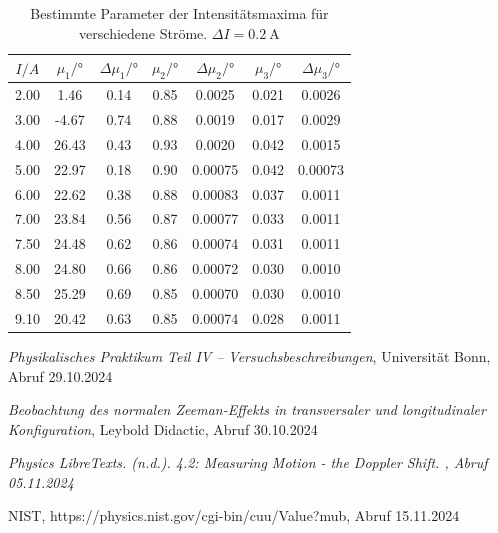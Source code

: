 \documentclass{article}
\begin{document}
\begin{table}[h]
  \centering
  \begin{tabular}{|ccccccc|}
    \toprule
    {$I/\si{A}$} & {$\mu_1/\si{\degree}$} & {$\Delta \mu_1/\si{\degree}$} & {$\mu_2/\si{\degree}$} & {$\Delta \mu_2/\si{\degree}$} & {$\mu_3/\si{\degree}$} & {$\Delta \mu_3/\si{\degree}$} \\
    \midrule
      2.00 & 1.46 & 0.14 & 0.85 & 0.0025 & 0.021 & 0.0026 \\
      3.00 & -4.67 & 0.74 & 0.88 & 0.0019 & 0.017 & 0.0029 \\
      4.00 & 26.43 & 0.43 & 0.93 & 0.0020 & 0.042 & 0.0015 \\
      5.00 & 22.97 & 0.18 & 0.90 & 0.00075 & 0.042 & 0.00073 \\
      6.00 & 22.62 & 0.38 & 0.88 & 0.00083 & 0.037 & 0.0011 \\
      7.00 & 23.84 & 0.56 & 0.87 & 0.00077 & 0.033 & 0.0011 \\
      7.50 & 24.48 & 0.62 & 0.86 & 0.00074 & 0.031 & 0.0011 \\
      8.00 & 24.80 & 0.66 & 0.86 & 0.00072 & 0.030 & 0.0010 \\
      8.50 & 25.29 & 0.69 & 0.85 & 0.00070 & 0.030 & 0.0010 \\
      9.10 & 20.42 & 0.63 & 0.85 & 0.00074 & 0.028 & 0.0011 \\
    \bottomrule
  \end{tabular}
  \caption{Bestimmte Parameter der Intensitätsmaxima für verschiedene Ströme. $\Delta I=\SI{0.2}{\A}$}
  \label{tab:parameter}
\end{table}



\begin{thebibliography}{9}

\textit{Physikalisches Praktikum Teil IV -- Versuchsbeschreibungen}, Universität Bonn, Abruf 29.10.2024

\textit{Beobachtung des normalen Zeeman-Effekts in transversaler und longitudinaler Konfiguration}, Leybold Didactic, Abruf 30.10.2024

\textit{Physics LibreTexts. (n.d.). 4.2: Measuring Motion - the Doppler Shift. , Abruf 05.11.2024}
\label{einheit}

NIST, https://physics.nist.gov/cgi-bin/cuu/Value?mub, Abruf 15.11.2024

\end{thebibliography}
\end{document}
